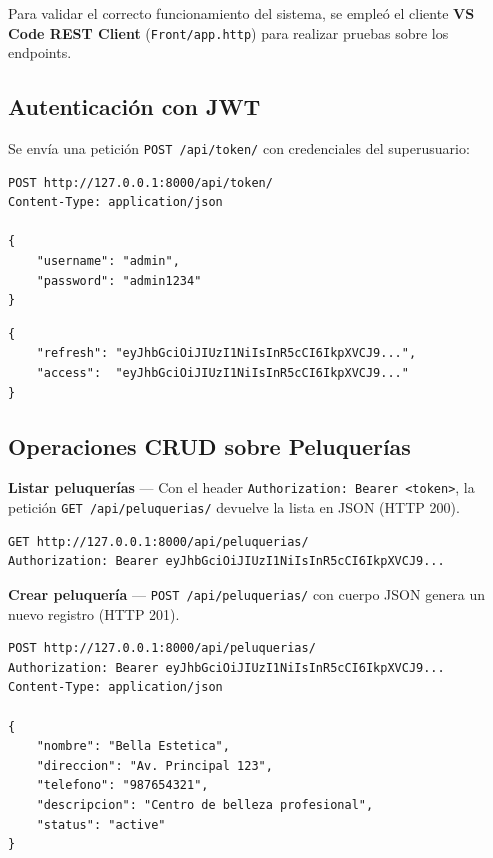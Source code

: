 \documentclass[12pt,a4paper]{article}
\begin{document}
Para validar el correcto funcionamiento del sistema, se empleó el cliente
\textbf{VS Code REST Client} (\texttt{Front/app.http}) para realizar pruebas sobre los endpoints.

\subsection{Autenticación con JWT}

Se envía una petición \texttt{POST /api/token/} con credenciales del superusuario:

\begin{lstlisting}[caption=Obtener token JWT — Solicitud]
POST http://127.0.0.1:8000/api/token/
Content-Type: application/json

{
    "username": "admin",
    "password": "admin1234"
}
\end{lstlisting}

\begin{lstlisting}[caption=Obtener token JWT — Respuesta]
{
    "refresh": "eyJhbGciOiJIUzI1NiIsInR5cCI6IkpXVCJ9...",
    "access":  "eyJhbGciOiJIUzI1NiIsInR5cCI6IkpXVCJ9..."
}
\end{lstlisting}

\subsection{Operaciones CRUD sobre Peluquerías}

\textbf{Listar peluquerías} — Con el header \texttt{Authorization: Bearer <token>},
la petición \texttt{GET /api/peluquerias/} devuelve la lista en JSON (HTTP 200).

\begin{lstlisting}[caption=Listar peluquerías — Solicitud]
GET http://127.0.0.1:8000/api/peluquerias/
Authorization: Bearer eyJhbGciOiJIUzI1NiIsInR5cCI6IkpXVCJ9...
\end{lstlisting}

\textbf{Crear peluquería} — \texttt{POST /api/peluquerias/} con cuerpo JSON genera un nuevo
registro (HTTP 201).

\begin{lstlisting}[caption=Crear peluquería — Solicitud]
POST http://127.0.0.1:8000/api/peluquerias/
Authorization: Bearer eyJhbGciOiJIUzI1NiIsInR5cCI6IkpXVCJ9...
Content-Type: application/json

{
    "nombre": "Bella Estetica",
    "direccion": "Av. Principal 123",
    "telefono": "987654321",
    "descripcion": "Centro de belleza profesional",
    "status": "active"
}
\end{lstlisting}
\end{document}
